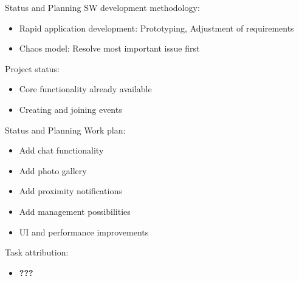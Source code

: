 \documentclass[logo=EURECOM,english]{eurecombeamer}
\newcommand{\todo}[1]{\textbf{\color{red} #1}}
\begin{document}
\begin{frame}{Status and Planning}
SW development methodology:
\begin{itemize}
\item Rapid application development: Prototyping, Adjustment of requirements
\item Chaos model: Resolve most important issue first\bigskip
\end{itemize}
Project status:
\begin{itemize}
\item Core functionality already available
\item Creating and joining events
\end{itemize}
\end{frame}

\begin{frame}{Status and Planning}
Work plan:
\begin{itemize}
\item Add chat functionality
\item Add photo gallery
\item Add proximity notifications
\item Add management possibilities
\item UI and performance improvements\bigskip
\end{itemize}
Task attribution:
\begin{itemize}
\item \todo{???}
\end{itemize}
\end{frame}

\begin{frame}
\end{frame}

\begin{frame}
\end{frame}
\end{document}
